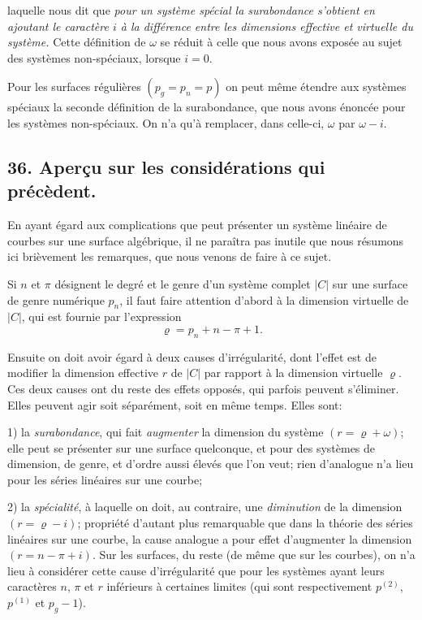 \documentclass{article}
\begin{document}
laquelle nous dit que \emph{pour un système spécial la surabondance s'obtient en ajoutant le caractère $i$ à la différence entre les dimensions effective et virtuelle du système.} Cette définition de $\omega$ se réduit à celle que nous avons exposée au sujet des systèmes non-spéciaux, lorsque $i = 0$.

Pour les surfaces régulières $(p_{g} = p_{n} = p)$ on peut même étendre aux systèmes spéciaux la seconde définition de la surabondance, que nous avons énoncée pour les systèmes non-spéciaux. On n'a qu'à remplacer, dans celle-ci, $\omega$ par $\omega - i$.

\subsection*{36. Aperçu sur les considérations qui précèdent.}

En ayant égard aux complications que peut présenter un système linéaire de courbes sur une surface algébrique, il ne paraîtra pas inutile que nous résumons ici brièvement les remarques, que nous venons de faire à ce sujet.

Si $n$ et $\pi$ désignent le degré et le genre d'un système complet $|C|$ sur une surface de genre numérique $p_{n}$, il faut faire attention d'abord à la dimension virtuelle de $|C|$, qui est fournie par l'expression
\[ \varrho = p_{n} + n - \pi + 1. \]

Ensuite on doit avoir égard à deux causes d'irrégularité, dont l'effet est de modifier la dimension effective $r$ de $|C|$ par rapport à la dimension virtuelle $\varrho$. Ces deux causes ont du reste des effets opposés, qui parfois peuvent s'éliminer. Elles peuvent agir soit séparément, soit en même temps. Elles sont:

1) la \emph{surabondance}, qui fait \emph{augmenter} la dimension du système $(r = \varrho + \omega)$; elle peut se présenter sur une surface quelconque, et pour des systèmes de dimension, de genre, et d'ordre aussi élevés que l'on veut; rien d'analogue n'a lieu pour les séries linéaires sur une courbe;

2) la \emph{spécialité}, à laquelle on doit, au contraire, une \emph{diminution} de la dimension $(r = \varrho - i)$; propriété d'autant plus remarquable que dans la théorie des séries linéaires sur une courbe, la cause analogue a pour effet d'augmenter la dimension $(r = n - \pi + i)$. Sur les surfaces, du reste (de même que sur les courbes), on n'a lieu à considérer cette cause d'irrégularité que pour les systèmes ayant leurs caractères $n$, $\pi$ et $r$ inférieurs à certaines limites (qui sont respectivement $p^{(2)}$, $p^{(1)}$ et $p_{g} - 1$).
\end{document}
